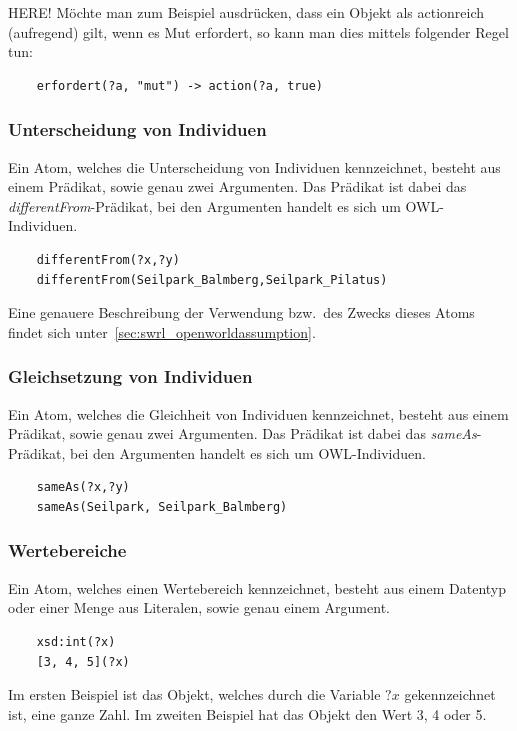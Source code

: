 HERE!
Möchte man zum Beispiel ausdrücken, dass ein Objekt als actionreich (aufregend) gilt, wenn es Mut erfordert, so kann man dies mittels folgender Regel tun:
\lstset{language=XML}
\begin{lstlisting}
    erfordert(?a, "mut") -> action(?a, true)
\end{lstlisting}

\subsubsection{Unterscheidung von Individuen}
\label{ssubsec:swrl_aufbau_atomaretypen_unterscheidungvonindividuen}
Ein Atom, welches die Unterscheidung von Individuen kennzeichnet, besteht aus einem Prädikat, sowie genau zwei Argumenten. Das Prädikat ist dabei das \textit{differentFrom}-Prädikat, bei den Argumenten handelt es sich um OWL-Individuen.
\lstset{language=XML}
\begin{lstlisting}
    differentFrom(?x,?y)
    differentFrom(Seilpark_Balmberg,Seilpark_Pilatus)
\end{lstlisting}
Eine genauere Beschreibung der Verwendung bzw.\ des Zwecks dieses Atoms findet sich unter~\ref{sec:swrl_openworldassumption}.

\subsubsection{Gleichsetzung von Individuen}
\label{ssubsec:swrl_aufbau_atomaretypen_gleichsetzungvonindividuen}
Ein Atom, welches die Gleichheit von Individuen kennzeichnet, besteht aus einem Prädikat, sowie genau zwei Argumenten. Das Prädikat ist dabei das \textit{sameAs}-Prädikat, bei den Argumenten handelt es sich um OWL-Individuen.
\lstset{language=XML}
\begin{lstlisting}
    sameAs(?x,?y)
    sameAs(Seilpark, Seilpark_Balmberg)
\end{lstlisting}

\subsubsection{Wertebereiche}
\label{ssubsec:swrl_aufbau_atomaretypen_wertebereiche}
Ein Atom, welches einen Wertebereich kennzeichnet, besteht aus einem Datentyp oder einer Menge aus Literalen, sowie genau einem Argument.
\lstset{language=XML}
\begin{lstlisting}
    xsd:int(?x)
    [3, 4, 5](?x)
\end{lstlisting}
Im ersten Beispiel ist das Objekt, welches durch die Variable $?x$ gekennzeichnet ist, eine ganze Zahl. Im zweiten Beispiel hat das Objekt den Wert 3, 4 oder 5.

